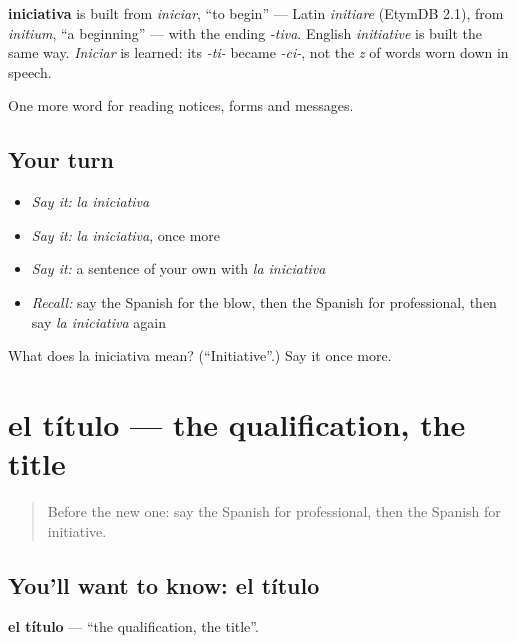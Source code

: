 \begin{cousinweb}
\textbf{iniciativa} is built from \emph{iniciar}, \textquotedblleft{}to begin\textquotedblright{} — Latin \emph{initiare} (EtymDB 2.1), from \emph{initium}, \textquotedblleft{}a beginning\textquotedblright{} — with the ending \emph{-tiva}. English \emph{initiative} is built the same way. \emph{Iniciar} is learned: its \emph{-ti-} became \emph{-ci-}, not the \emph{z} of words worn down in speech.
\end{cousinweb}

\begin{grammarlens}[title={What you've built}]
One more word for reading notices, forms and messages.
\end{grammarlens}

\subsection*{Your turn}
\begin{itemize}
\raggedright
  \item \emph{Say it:} \emph{la iniciativa}
  \item \emph{Say it:} \emph{la iniciativa}, once more
  \item \emph{Say it:} a sentence of your own with \emph{la iniciativa}
  \item \emph{Recall:} say the Spanish for the blow, then the Spanish for professional, then say \emph{la iniciativa} again
\end{itemize}

\begin{tcolorbox}[breakable,colback=teal!4,colframe=teal!35!black,title={Before you move on}]
What does la iniciativa mean? (\textquotedblleft{}Initiative\textquotedblright{}.) Say it once more.
\end{tcolorbox}
\section[el título]{el título — the qualification, the title}

\label{lesson:ES-C475-titulo}



\begin{quote}
Before the new one: say the Spanish for professional, then the Spanish for initiative.
\end{quote}

\subsection*{You'll want to know: el título}
\textbf{el título} — \textquotedblleft{}the qualification, the title\textquotedblright{}.

